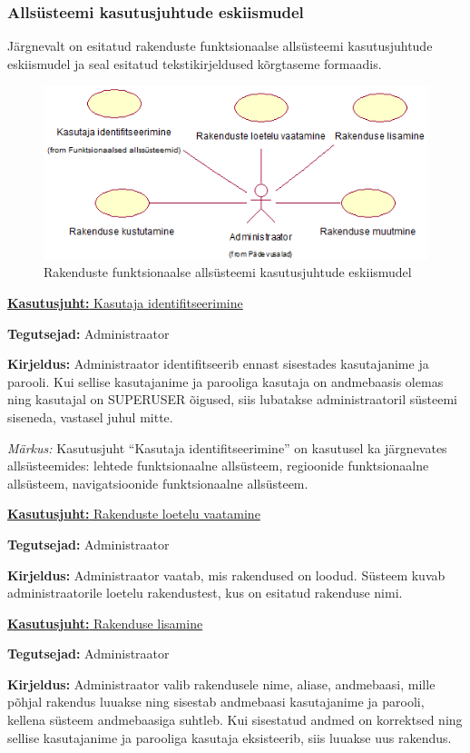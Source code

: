 \documentclass[a4paper,12pt]{article} %
\begin{document}
\subsubsection{Allsüsteemi kasutusjuhtude eskiismudel}
Järgnevalt on esitatud rakenduste funktsionaalse allsüsteemi kasutusjuhtude eskiismudel ja seal esitatud tekstikirjeldused kõrgtaseme formaadis.
\begin{figure}[H]
\begin{center}
\includegraphics[bb=0 0 494 223,scale=1]{./diagrams/applications-subsystem-use-case-digram.png}
\caption{Rakenduste funktsionaalse allsüsteemi kasutusjuhtude eskiismudel}
\end{center}
\end{figure}
\underline{\textbf{Kasutusjuht:} Kasutaja identifitseerimine}
\par
\textbf{Tegutsejad:} Administraator
\par
\textbf{Kirjeldus:} Administraator identifitseerib ennast sisestades kasutajanime ja parooli. Kui sellise kasutajanime ja parooliga kasutaja on andmebaasis olemas ning kasutajal on SUPERUSER õigused, siis lubatakse administraatoril süsteemi siseneda, vastasel juhul mitte.
\par
\textit{Märkus:} Kasutusjuht  ``Kasutaja identifitseerimine'' on kasutusel ka järgnevates allsüsteemides: lehtede funktsionaalne allsüsteem, regioonide funktsionaalne allsüsteem, navigatsioonide funktsionaalne allsüsteem.\par

\underline{\textbf{Kasutusjuht:} Rakenduste loetelu vaatamine}
\par
\textbf{Tegutsejad:} Administraator
\par
\textbf{Kirjeldus:} Administraator vaatab, mis rakendused on loodud. Süsteem kuvab administraatorile loetelu rakendustest, kus on esitatud rakenduse nimi.
\par

\underline{\textbf{Kasutusjuht:} Rakenduse lisamine}
\par
\textbf{Tegutsejad:} Administraator
\par
\textbf{Kirjeldus:} Administraator valib rakendusele nime, aliase, andmebaasi, mille põhjal rakendus luuakse ning sisestab andmebaasi kasutajanime ja parooli, kellena süsteem andmebaasiga suhtleb. Kui sisestatud andmed on korrektsed ning sellise kasutajanime ja parooliga kasutaja eksisteerib, siis luuakse uus rakendus.
\par
\end{document}
